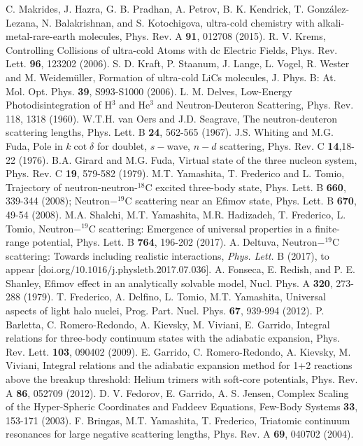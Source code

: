\documentclass[twocolumn,amsmath,amssymb,epsfig,aps,prl]{revtex4}
\begin{document}
\begin{thebibliography}{40}
 C. Makrides, J. Hazra, G. B. Pradhan, A. Petrov, B. K. Kendrick, T. Gonz\'alez-Lezana, 
N. Balakrishnan, and S. Kotochigova, ultra-cold chemistry with alkali-metal-rare-earth molecules,
Phys. Rev. A {\bf 91}, 012708 (2015).
 R. V. Krems, Controlling Collisions of ultra-cold Atoms with dc Electric Fields,
Phys. Rev. Lett. {\bf 96}, 123202 (2006).
 S. D. Kraft, P. Staanum, J. Lange, L. Vogel, R. Wester and M. Weidem\"uller, 
Formation of ultra-cold LiCs molecules, J. Phys. B: At. Mol. Opt. Phys. {\bf 39}, S993-S1000 (2006).
 L. M. Delves, Low-Energy Photodisintegration of H$^{3}$ and He$^{3}$ and Neutron-Deuteron Scattering,
Phys. Rev. 118, 1318 (1960).
 W.T.H. van Oers and J.D. Seagrave, The neutron-deuteron scattering lengths, 
Phys. Lett. B {\bf 24}, 562-565 (1967).
 J.S. Whiting and M.G. Fuda, Pole in $k\cot\delta$ for doublet, $s-$wave, 
$n-d$ scattering, Phys. Rev. C {\bf 14},18-22  (1976).
 B.A. Girard and M.G. Fuda, Virtual state of the three nucleon system, 
Phys. Rev. C {\bf 19}, 579-582  (1979).
 M.T. Yamashita, T. Frederico and L. Tomio, Trajectory of neutron-neutron-$^{18}$C
excited three-body state, Phys. Lett. B {\bf 660}, 339-344 (2008);
Neutron$-^{19}$C scattering near an Efimov state, Phys. Lett. B {\bf 670}, 49-54 (2008).
 M.A. Shalchi, M.T. Yamashita, M.R. Hadizadeh, T. Frederico, L. Tomio, Neutron$-^{19}$C 
scattering: Emergence of universal properties in a finite-range potential, Phys. Lett. B {\bf 764},
196-202 (2017).
 A. Deltuva, 
Neutron$-^{19}$C scattering: Towards including realistic interactions,
{\it Phys. Lett.} B (2017), to appear [doi.org$/10.1016/$j.physletb.2017.07.036].
 A. Fonseca, E. Redish, and P. E. Shanley, Efimov effect in an analytically solvable model, 
Nucl. Phys. A {\bf 320}, 273-288 (1979).
 T. Frederico, A. Delfino, L. Tomio, M.T. Yamashita, Universal aspects of light
halo nuclei, Prog. Part. Nucl. Phys. {\bf 67}, 939-994 (2012).
 P. Barletta, C. Romero-Redondo, A. Kievsky, M. Viviani, E. Garrido, 
Integral relations for three-body continuum states with the adiabatic expansion, 
Phys. Rev. Lett. {\bf 103}, 090402 (2009). 
 E. Garrido, C. Romero-Redondo, A. Kievsky, M. Viviani, 
Integral relations and the adiabatic expansion method for 1+2 reactions above the breakup threshold: 
Helium trimers with soft-core potentials, 
Phys. Rev. A {\bf 86}, 052709 (2012).
 D. V. Fedorov, E. Garrido, A. S. Jensen,
 Complex Scaling of the Hyper-Spheric Coordinates and Faddeev Equations,
Few-Body Systems {\bf 33}, 153-171 (2003).
F. Bringas, M.T. Yamashita, T. Frederico, Triatomic continuum resonances for large negative scattering lengths, 
Phys. Rev. A {\bf 69},  040702 (2004). 
\end{thebibliography}
\end{document}
